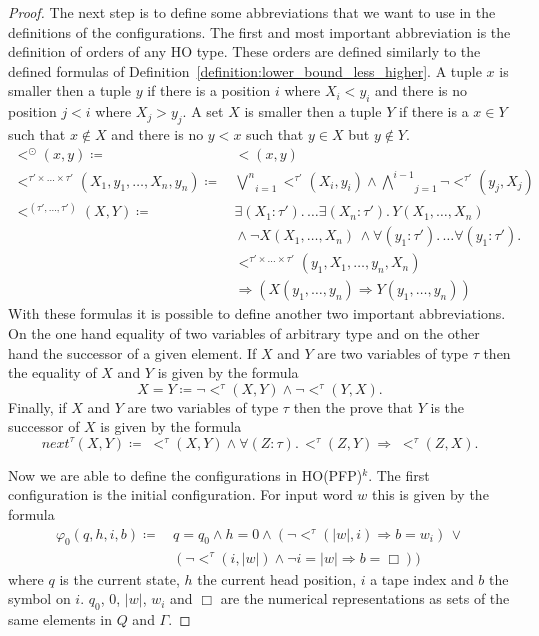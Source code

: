 \begin{proof}
    The next step is to define some abbreviations that we want to use in the definitions of the configurations. The
    first and most important abbreviation is the definition of orders of any HO type. These orders are defined similarly
    to the defined formulas of Definition~\ref{definition:lower_bound_less_higher}. A tuple $x$ is smaller then a tuple $y$ if there is a position $i$ where $X_i < y_i$ and there is no position $j<i$ where $X_j > y_j$. A set $X$ is smaller then a tuple $Y$ if there is a $x \in Y$ such that $x \not\in X$ and there is no $y<x$ such that $y\in X$ but $y\not\in Y$.
    \begin{align*}
        <^\odot(x, y) \coloneqq &\,<(x, y) \\
        <^{\tau' \times \dots \times \tau'}(X_1, y_1, \dots, X_n, y_n) \coloneqq &\,\underset{i =
        1}{\overset{n}{\bigvee}}<^{\tau'}(X_i, y_i) \wedge \underset{j = 1}{\overset{i - 1}{\bigwedge}}
        \neg <^{\tau'}(y_j, X_j)\\
        <^{(\tau', \dots, \tau')}(X, Y) \coloneqq &\,\exists (X_1 \colon {\tau'}). \,\dots \exists(X_n \colon
        {\tau'}).\, Y(X_1, \dots, X_n)
        \\&\,\wedge \neg X(X_1, \dots, X_n)\,\wedge \forall (y_1 \colon {\tau'}). \,\dots
        \forall(y_1 \colon {\tau'}).\,\\&\,<^{\tau'\times \dots \times \tau'}
        (y_1, X_1, \dots, y_n, X_n) \\&\,\Rightarrow (X(y_1, \dots, y_n) \Rightarrow Y(y_1, \dots, y_n))
    \end{align*}
    With these formulas it is possible to define another two important abbreviations. On the one hand equality
    of two variables of arbitrary type and on the other hand the successor of a given element. If $X$ and
    $Y$ are two variables of type $\tau$ then the equality of $X$ and $Y$ is given by the formula
    \[X = Y \coloneqq \neg<^\tau(X, Y) \wedge \neg <^\tau(Y, X).\]
    Finally, if $X$ and $Y$ are two variables of type $\tau$ then the prove that $Y$ is the successor of $X$ is given by
    the formula
    \[next^{\tau}(X, Y) \coloneqq\; <^\tau(X, Y) \wedge \forall (Z \colon \tau).\, <^\tau(Z, Y) \Rightarrow\;<^\tau
    (Z, X).\]

    Now we are able to define the configurations in HO(PFP)$^k$. The first configuration is the initial configuration. For input word $w$ this is given by the formula
    \begin{align*}
        \varphi_0(q, h, i, b) \coloneqq &\,q = q_0 \wedge h = 0 \wedge (\neg <^\tau(|w|, i) \Rightarrow b = w_{i})\,
        \vee\\&\,(\neg <^\tau (i, |w|) \wedge \neg i = |w| \Rightarrow b = \Box))
    \end{align*}
    where $q$ is the current state, $h$ the current head position, $i$ a tape index and $b$ the symbol on $i$. $q_0$,
    $0$, $|w|$, $w_{i}$ and $\Box$ are the numerical representations as sets of the same elements in $Q$ and $\Gamma$.


\end{proof}

